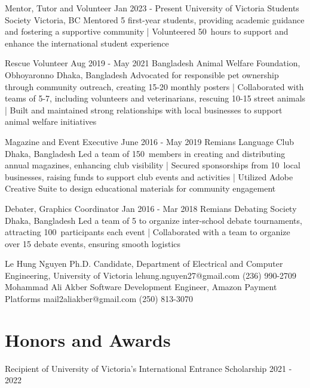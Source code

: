 \documentclass[a4paper,10pt]{article}
\begin{document}
\volunteeringexperiences
{Mentor, Tutor and Volunteer}
{Jan 2023 - Present}
{University of Victoria Students Society}
{Victoria, BC}
{Mentored 5 first-year students, providing academic guidance and fostering a supportive community
| Volunteered 50\plus\ hours to support and enhance the international student experience 
}

\volunteeringexperiences
{Rescue Volunteer}
{Aug 2019 - May 2021}
{Bangladesh Animal Welfare Foundation, Obhoyaronno}
{Dhaka, Bangladesh}
{Advocated for responsible pet ownership through community outreach, creating 15-20 monthly posters 
| Collaborated with teams of 5-7, including volunteers and veterinarians, rescuing 10-15 street animals 
| Built and maintained strong relationships with local businesses to support animal welfare initiatives
}

\volunteeringexperiences
{Magazine and Event Executive}
{June 2016 - May 2019}
{Remians Language Club}
{Dhaka, Bangladesh}
{Led a team of 150\plus\ members in creating and distributing annual magazines, enhancing club visibility
| Secured sponsorships from 10\plus\ local businesses, raising funds to support club events and activities 
| Utilized Adobe Creative Suite to design educational materials for community engagement
}

\volunteeringexperiences
{Debater, Graphics Coordinator}
{Jan 2016 - Mar 2018}
{Remians Debating Society}
{Dhaka, Bangladesh}
{Led a team of 5 to organize inter-school debate tournaments, attracting 100\plus\ participants each event
| Collaborated with a team to organize over 15 debate events, ensuring smooth logistics 
}

\begin{references}
        {Le Hung Nguyen}
        {Ph.D. Candidate, Department of Electrical and}
        {Computer Engineering, University of Victoria}
        {lehung.nguyen27@gmail.com}
        {(236) 990-2709}
    \hfill
        {Mohammad Ali Akber}
        {Software Development Engineer,}
        {Amazon Payment Platforms}
        {mail2aliakber@gmail.com}
        {(250) 813-3070}
\end{references}

\section{Honors and Awards}
\honorsawards
{Recipient of University of Victoria’s International Entrance Scholarship}
{2021 - 2022}
\end{document}
